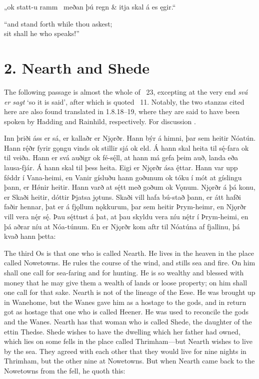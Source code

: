 \bvg\bva[][8]„ok statt-u ramm \hld\ meðan þú regn &
\ind {}itja skal á es ęgir.“\eva

\bvb “and stand forth while thou askest; \\
\ind sit shall he who speaks!”\evb\evg

\sectionline

\section{2. Nearth and Shede}

The following passage is almost the whole of \Gylfaginning\ 23, excepting at the very end \emph{svá er sagt} ‘so it is said’, after which is quoted \Grimnismal\ 11.
Notably, the two stanzas cited here are also found translated in \textcite{Saxo} 1.8.18–19, where they are said to have been spoken by Hadding and Rainhild, respectively.  For discussion \textcite{Hopkins2021}.

\sectionline

\bpg\bpa[0]Inn þriði áss er sá, er kallaðr er Njǫrðr. Hann býr á himni, þar sem heitir Nóatún. Hann rę́ðr fyrir gǫngu vinds ok stillir sjá ok eld. Á hann skal heita til sę́-fara ok til veiða. Hann er svá auðigr ok fé-sę́ll, at hann má gefa þeim auð, landa eða lausa-fjár. Á hann skal til þess heita. Eigi er Njǫrðr ása ę́ttar. Hann var upp fǿddr í Vana-heimi, en Vanir gísluðu hann goðunum ok tóku í mót at gíslingu þann, er Hǿnir heitir. Hann varð at sę́tt með goðum ok Vǫnum. Njǫrðr á þá konu, er Skaði heitir, dóttir Þjatsa jǫtuns. Skaði vill hafa bú-stað þann, er átt hafði faðir hennar, þat er á fjǫllum nǫkkurum, þar sem heitir Þrym-heimr, en Njǫrðr vill vera nę́r sę́. Þau sę́ttust á þat, at þau skyldu vera níu nę́tr í Þrym-heimi, en þá aðrar níu at Nóa-túnum. En er Njǫrðr kom aftr til Nóatúna af fjallinu, þá kvað hann þetta:\epa

\bpb The third Os is that one who is called Nearth. He lives in the heaven in the place called Nowetowns. He rules the course of the wind, and stills sea and fire. On him shall one call for sea-faring and for hunting. He is so wealthy and blessed with money that he may give them a wealth of lands or loose property; on him shall one call for that sake. Nearth is not of the lineage of the Eese. He was brought up in Wanehome, but the Wanes gave him as a hostage to the gods, and in return got as hostage that one who is called Heener. He was used to reconcile the gods and the Wanes. Nearth has that woman who is called Shede, the daughter of the ettin Thedse. Shede wishes to have the dwelling which her father had owned, which lies on some fells in the place called Thrimham—but Nearth wishes to live by the sea. They agreed with each other that they would live for nine nights in Thrimham, but the other nine at Nowetowns. But when Nearth came back to the Nowetowns from the fell, he quoth this:\epb\epg

